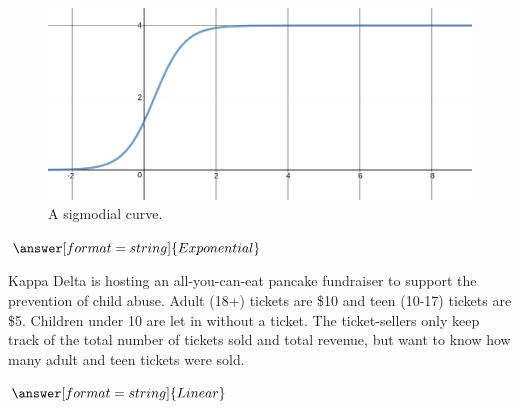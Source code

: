 \documentclass{ximera}
\begin{document}
\begin{question}

\begin{figure}
	\includegraphics[scale=0.5]{logarithmicGrowth.png}
	\caption{A sigmodial curve.}
\end{figure}

$\answer[format=string]{Exponential}$

\end{question}

\begin{question}
Kappa Delta is hosting an all-you-can-eat pancake fundraiser to support the prevention of child abuse. Adult (18+) tickets are \$10 and teen (10-17) tickets are \$5. Children under 10 are let in without a ticket. The ticket-sellers only keep track of the total number of tickets sold and total revenue, but want to know how many adult and teen tickets were sold. 

$\answer[format=string]{Linear}$

\end{question}
\end{document}
